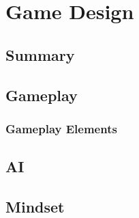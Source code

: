 \section{Game Design}
    \subsection{Summary}
    \subsection{Gameplay}
        \subsubsection{Gameplay Elements}
    \subsection{AI}
    \subsection{Mindset}